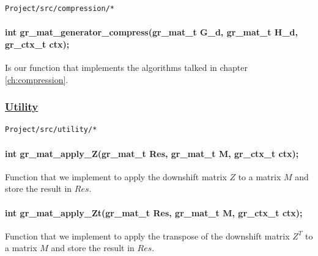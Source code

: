 \begin{verbatim}
Project/src/compression/*
\end{verbatim}

\paragraph{int gr\_mat\_generator\_compress(gr\_mat\_t G\_d,
gr\_mat\_t H\_d, gr\_ctx\_t ctx);} Is our function that implements
the algorithms talked in chapter \ref{ch:compression}.

\subsubsection*{\underline{Utility}}\label{annexe:utility}
\begin{verbatim}
Project/src/utility/*
\end{verbatim}

\paragraph{int gr\_mat\_apply\_Z(gr\_mat\_t Res, gr\_mat\_t M, gr\_ctx\_t ctx);}
Function that we implement to apply the downshift matrix $Z$ to a
matrix $M$ and store the result in $Res$.
\paragraph{int gr\_mat\_apply\_Zt(gr\_mat\_t Res, gr\_mat\_t M,
gr\_ctx\_t ctx);}
Function that we implement to apply the transpose of the downshift
matrix $Z^T$ to a matrix $M$ and store the result in $Res$.
